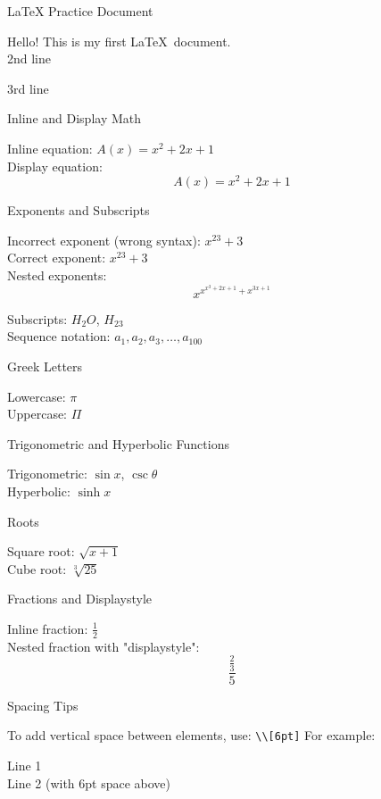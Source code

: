\documentclass[11pt]{article}
\begin{document}
LaTeX Practice Document

Hello! This is my first \LaTeX\ document.\\ %
2nd line

3rd line  %

Inline and Display Math

Inline equation: $A(x) = x^2 + 2x + 1$\\  
Display equation:
\[
A(x) = x^2 + 2x + 1
\]

Exponents and Subscripts

Incorrect exponent (wrong syntax): $x^23 + 3$\\  
Correct exponent: $x^{23} + 3$\\

Nested exponents:  
\[
x^{x^{x^3 + 2x + 1} + x^{3x + 1}}
\]

Subscripts:  
$H_2O$, $H_{23}$\\
Sequence notation: $a_1, a_2, a_3, \ldots, a_{100}$

Greek Letters

Lowercase: $\pi$\\
Uppercase: $\Pi$

Trigonometric and Hyperbolic Functions

Trigonometric: $\sin x$, $\csc \theta$\\
Hyperbolic: $\sinh x$

Roots

Square root: $\sqrt{x + 1}$\\
Cube root: $\sqrt[3]{25}$

Fractions and Displaystyle

Inline fraction: $\frac{1}{2}$\\
Nested fraction with "displaystyle":
\[
\displaystyle \frac{\frac{2}{3}}{5}
\]

Spacing Tips

To add vertical space between elements, use: \verb|\\[6pt]|  
For example:

Line 1\\[6pt]
Line 2 (with 6pt space above)
\end{document}
